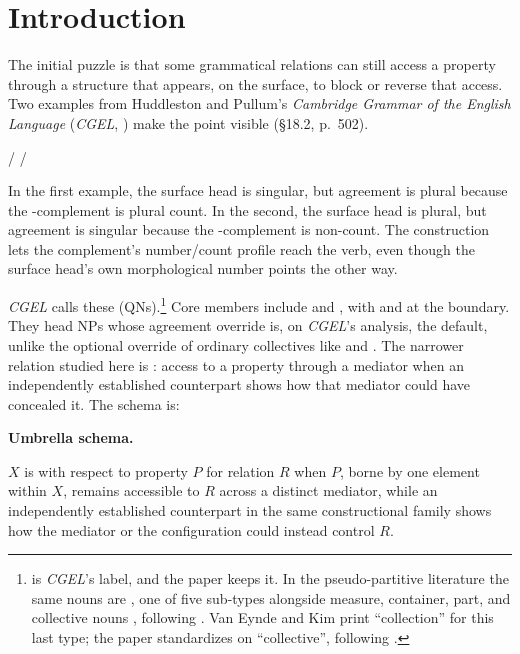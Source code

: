 \section{Introduction}\label{sec:1}

The initial puzzle is that some grammatical relations can still access a property through a structure that appears, on the surface, to block or reverse that access. Two examples from Huddleston and Pullum's \textit{Cambridge Grammar of the English Language} (\textit{CGEL}, \citeyear{huddleston-pullum-2002}) make the point visible (§18.2, p.~502).

\ea\label{ex:cgel-two-direction}
\ea {}/ 
\ex {}/ 
\z
\z

In the first example, the surface head  is singular, but agreement is plural because the -complement  is plural count. In the second, the surface head  is plural, but agreement is singular because the -complement  is non-count. The construction lets the complement's number/count profile reach the verb, even though the surface head's own morphological number points the other way.

\textit{CGEL} calls these  (QNs).\footnote{ is \textit{CGEL}'s label, and the paper keeps it. In the pseudo-partitive literature the same nouns are , one of five sub-types alongside measure, container, part, and collective nouns \autocite[271]{van-eynde-kim-2023-pseudo-partitives}, following \textcite[109]{keizer-2007-english-noun-phrase}. Van Eynde and Kim print \enquote{collection} for this last type; the paper standardizes on \enquote{collective}, following \textcite{kim-2026-form-function}.} Core members include  and , with  and  at the boundary. They head NPs whose agreement override is, on \textit{CGEL}'s analysis, the default, unlike the optional override of ordinary collectives like  and . The narrower relation studied here is : access to a property through a mediator when an independently established counterpart shows how that mediator could have concealed it. The schema is:
\begin{schemabox}
\textbf{Umbrella schema.}\par\smallskip
$X$ is  with respect to property $P$ for relation $R$ when $P$, borne by one element within $X$, remains accessible to $R$ across a distinct mediator, while an independently established counterpart in the same constructional family shows how the mediator or the configuration could instead control $R$.
\end{schemabox}

